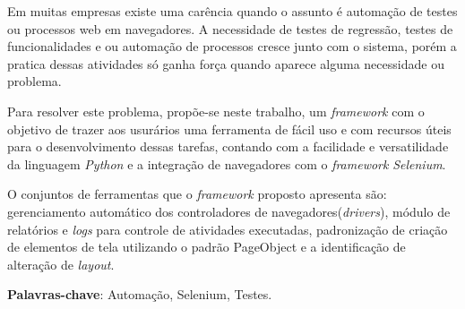 %
%

\begin{RESUMO}
\thispagestyle{empty}
	\begin{SingleSpace}


		Em muitas empresas existe uma carência quando o assunto é automação de testes ou processos web em navegadores. A necessidade de testes de regressão, testes de funcionalidades e ou
        automação de processos cresce junto com o sistema, porém a pratica dessas atividades só ganha força quando aparece alguma necessidade ou problema.

        Para resolver este problema, propõe-se neste trabalho, um \textit{framework} com o objetivo de trazer aos usurários uma ferramenta de fácil uso e com recursos úteis para o desenvolvimento dessas tarefas, contando com a facilidade e versatilidade da
        linguagem \emph{Python} e a integração de navegadores com o \textit{framework} \emph{Selenium}.

        O conjuntos de ferramentas que o \textit{framework} proposto apresenta são: gerenciamento automático dos controladores de navegadores(\emph{drivers}), módulo de relatórios e \textit{logs} para controle de atividades executadas,
        padronização de criação de elementos de tela utilizando o padrão PageObject e a identificação de alteração de \textit{layout}.

		\vspace*{0.5cm}\hspace{-1.3 cm}\textbf{Palavras-chave}: Automação, Selenium, Testes.

	\end{SingleSpace}
\end{RESUMO}


